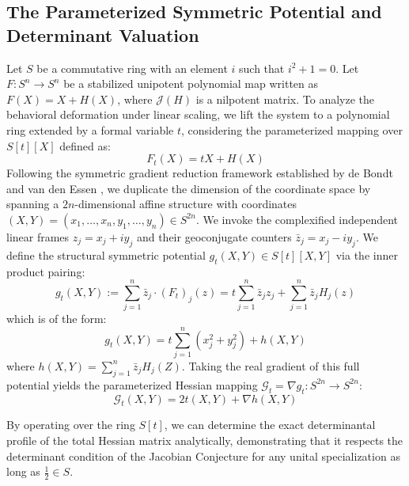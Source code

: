 \documentclass[11pt,a4paper]{article}
\begin{document}
\subsection{The Parameterized Symmetric Potential and Determinant Valuation}
\label{subsec:symmetric_potential}

Let $S$ be a commutative ring with an element $i$ such that $i^2 + 1 = 0$. Let $F: S^n \to S^n$ be a stabilized unipotent polynomial map written as $F(X) = X + H(X)$, where $\mathcal{J}(H)$ is a nilpotent matrix. To analyze the behavioral deformation under linear scaling, we lift the system to a polynomial ring extended by a formal variable $t$, considering the parameterized mapping over $S[t][X]$ defined as:
\begin{equation}
F_t(X) = tX + H(X)
\end{equation}
Following the symmetric gradient reduction framework established by de Bondt and van den Essen \cite{BE2005}, we duplicate the dimension of the coordinate space by spanning a $2n$-dimensional affine structure with coordinates $(X,Y) = (x_1, \ldots, x_n, y_1, \ldots, y_n) \in S^{2n}$. We invoke the complexified independent linear frames $z_j = x_j + i y_j$ and their geoconjugate counters $\bar{z}_j = x_j - i y_j$. We define the structural symmetric potential $g_t(X,Y) \in S[t][X,Y]$ via the inner product pairing:
\begin{equation}
g_t(X,Y) := \sum_{j=1}^{n} \bar{z}_j \cdot (F_t)_j(z) = t \sum_{j=1}^{n} \bar{z}_j  z_j + \sum_{j=1}^{n} \bar{z}_j H_j(z) 
\end{equation}
which is of the form:
\begin{equation}
g_t(X,Y) = t \sum_{j=1}^{n} (x_j^2 + y_j^2) + h(X, Y) 
\end{equation}
where $h(X,Y) = \sum_{j=1}^n \bar{z}_j H_j(Z)$. Taking the real gradient of this full potential yields the parameterized Hessian mapping $\mathcal{G}_t = \nabla g_t: S^{2n} \to S^{2n}$:
\begin{equation}
\mathcal{G}_t(X,Y) = 2t(X,Y) + \nabla h(X,Y)
\end{equation}

By operating over the ring $S[t]$, we can determine the exact determinantal profile of the total Hessian matrix analytically, demonstrating that it respects the determinant condition of the Jacobian Conjecture for any unital specialization as long as $\frac12 \in S$.
\end{document}
